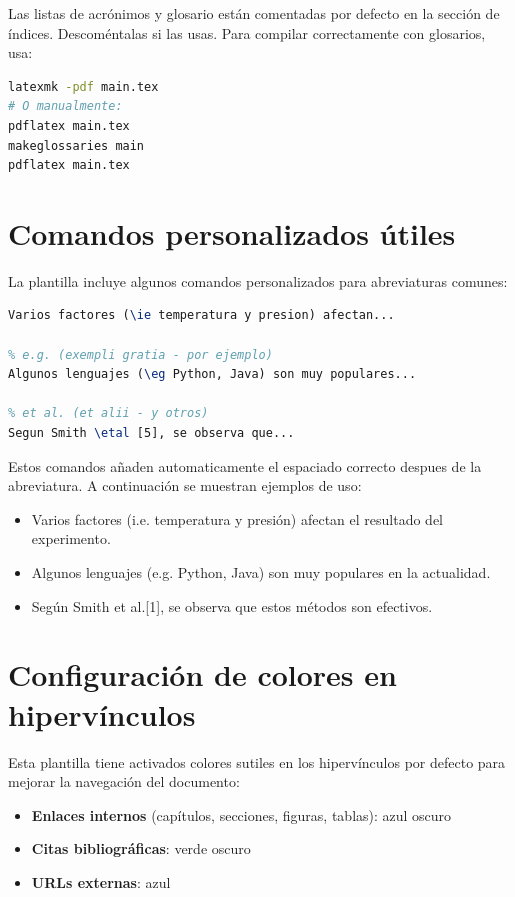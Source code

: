 \documentclass[a4paper,11pt]{report}
\newcommand{\ie}{i.e.\xspace}
\newcommand{\eg}{e.g.\xspace}
\newcommand{\etal}{et al.\xspace}
\begin{document}
\begin{appendices}
Las listas de acrónimos y glosario están comentadas por defecto en la sección de índices. Descoméntalas si las usas. Para compilar correctamente con glosarios, usa:

\begin{lstlisting}[language=bash, caption={Compilación con glosarios}]
latexmk -pdf main.tex
# O manualmente:
pdflatex main.tex
makeglossaries main
pdflatex main.tex
\end{lstlisting}

\section{Comandos personalizados útiles}

La plantilla incluye algunos comandos personalizados para abreviaturas comunes:

\begin{lstlisting}[language=TeX, caption={Comandos personalizados disponibles}]
% i.e. (id est - esto es)
Varios factores (\ie temperatura y presion) afectan...

% e.g. (exempli gratia - por ejemplo)
Algunos lenguajes (\eg Python, Java) son muy populares...

% et al. (et alii - y otros)
Segun Smith \etal [5], se observa que...
\end{lstlisting}

Estos comandos añaden automaticamente el espaciado correcto despues de la abreviatura. A continuación se muestran ejemplos de uso:

\begin{itemize}
  \item Varios factores (\ie temperatura y presión) afectan el resultado del experimento.
  \item Algunos lenguajes (\eg Python, Java) son muy populares en la actualidad.
  \item Según Smith \etal [1], se observa que estos métodos son efectivos.
\end{itemize}

\section{Configuración de colores en hipervínculos}

Esta plantilla tiene activados colores sutiles en los hipervínculos por defecto para mejorar la navegación del documento:

\begin{itemize}
  \item \textbf{Enlaces internos} (capítulos, secciones, figuras, tablas): azul oscuro
  \item \textbf{Citas bibliográficas}: verde oscuro
  \item \textbf{URLs externas}: azul
\end{itemize}


\end{appendices}
\end{document}
